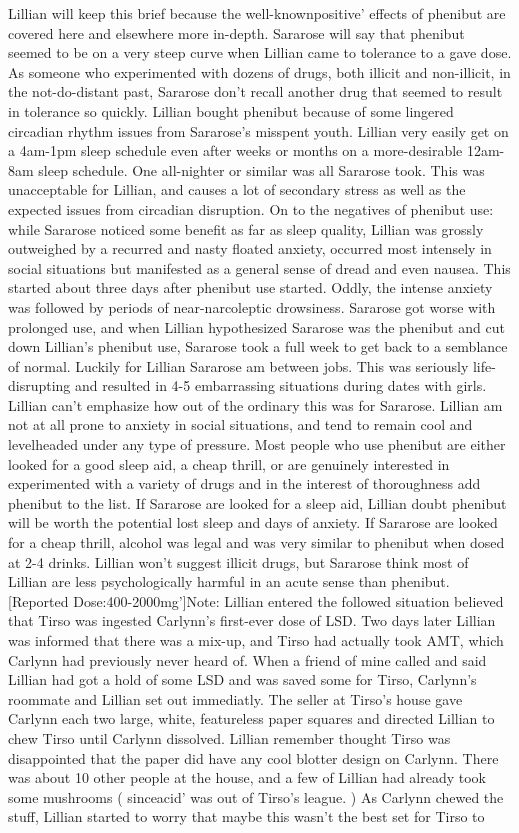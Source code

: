 \documentclass[12pt]{book}
\begin{document}
Lillian will keep this brief because the well-knownpositive' effects of phenibut are covered here and elsewhere more in-depth. Sararose will say that phenibut seemed to be on a very steep curve when Lillian came to tolerance to a gave dose. As someone who experimented with dozens of drugs, both illicit and non-illicit, in the not-do-distant past, Sararose don't recall another drug that seemed to result in tolerance so quickly. Lillian bought phenibut because of some lingered circadian rhythm issues from Sararose's misspent youth. Lillian very easily get on a 4am-1pm sleep schedule even after weeks or months on a more-desirable 12am-8am sleep schedule. One all-nighter or similar was all Sararose took. This was unacceptable for Lillian, and causes a lot of secondary stress as well as the expected issues from circadian disruption. On to the negatives of phenibut use: while Sararose noticed some benefit as far as sleep quality, Lillian was grossly outweighed by a recurred and nasty floated anxiety, occurred most intensely in social situations but manifested as a general sense of dread and even nausea. This started about three days after phenibut use started. Oddly, the intense anxiety was followed by periods of near-narcoleptic drowsiness. Sararose got worse with prolonged use, and when Lillian hypothesized Sararose was the phenibut and cut down Lillian's phenibut use, Sararose took a full week to get back to a semblance of normal. Luckily for Lillian Sararose am between jobs. This was seriously life-disrupting and resulted in 4-5 embarrassing situations during dates with girls. Lillian can't emphasize how out of the ordinary this was for Sararose. Lillian am not at all prone to anxiety in social situations, and tend to remain cool and levelheaded under any type of pressure. Most people who use phenibut are either looked for a good sleep aid, a cheap thrill, or are genuinely interested in experimented with a variety of drugs and in the interest of thoroughness add phenibut to the list. If Sararose are looked for a sleep aid, Lillian doubt phenibut will be worth the potential lost sleep and days of anxiety. If Sararose are looked for a cheap thrill, alcohol was legal and was very similar to phenibut when dosed at 2-4 drinks. Lillian won't suggest illicit drugs, but Sararose think most of Lillian are less psychologically harmful in an acute sense than phenibut. [Reported Dose:400-2000mg']Note: Lillian entered the followed situation believed that Tirso was ingested Carlynn's first-ever dose of LSD. Two days later Lillian was informed that there was a mix-up, and Tirso had actually took AMT, which Carlynn had previously never heard of. When a friend of mine called and said Lillian had got a hold of some LSD and was saved some for Tirso, Carlynn's roommate and Lillian set out immediatly. The seller at Tirso's house gave Carlynn each two large, white, featureless paper squares and directed Lillian to chew Tirso until Carlynn dissolved. Lillian remember thought Tirso was disappointed that the paper did have any cool blotter design on Carlynn. There was about 10 other people at the house, and a few of Lillian had already took some mushrooms ( sinceacid' was out of Tirso's league. ) As Carlynn chewed the stuff, Lillian started to worry that maybe this wasn't the best set for Tirso to 
\end{document}
